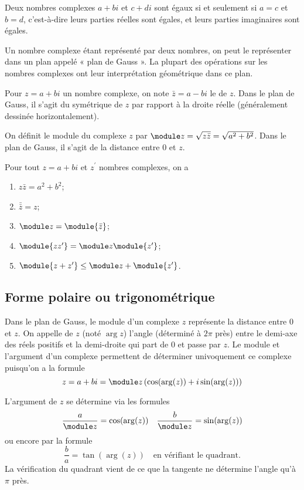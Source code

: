  Deux nombres complexes $a + bi$ et $c + di$ sont égaux si et seulement
 si $a = c$ et $b = d$, c'est-à-dire leurs parties réelles sont égales,
 et leurs parties imaginaires sont égales.

 Un nombre complexe étant représenté par deux nombres, on peut le
 représenter dans un plan appelé « plan de Gauss ». La plupart des
 opérations sur les nombres complexes ont leur interprétation
 géométrique dans ce plan.

 Pour $z = a + bi$ un nombre complexe, on note $\bar z = a - bi$ le
  de $z$. Dans le plan de Gauss, il s'agit du
 symétrique de $z$ par rapport à la droite réelle (généralement
 dessinée horizontalement).

 On définit le module du complexe $z$ par $\module z = \sqrt{z\bar z} =
 \sqrt{a^2 + b^2}$. Dans le plan de Gauss, il s'agit de la distance
 entre $0$ et $z$.

 \begin{proposition}
Pour tout $z = a+bi$ et $z^\prime$ nombres complexes, on a
   \begin{enumerate}
   \item $z \bar z = a^2 + b^2$;
   \item $\bar{\bar{z}} = z$;
   \item $\module z = \module {\bar z}$;
   \item $\module{zz^\prime} = \module z \module{z^\prime}$;
   \item $\module{z+z^\prime} \leq \module z + \module{z^\prime}$.
   \end{enumerate}
 \end{proposition}

 \subsection{Forme polaire ou trigonométrique}
 Dans le plan de Gauss, le module d'un complexe $z$ représente la
 distance entre $0$ et $z$. On appelle  de $z$ (noté
 $\arg z$) l'angle (déterminé à $2\pi$ près) entre le demi-axe des
 réels positifs et la demi-droite qui part de $0$ et passe par $z$. Le
 module et l'argument d'un complexe permettent de déterminer
 univoquement ce complexe puisqu'on a la formule
 \[z = a + bi = \module z \left( \cos(\arg(z)) + i \sin(\arg(z))
 \right)\]

 L'argument de $z$ se détermine via les formules
 \[\frac a {\module z} = \cos(\arg(z)) \quad \frac b {\module z} =
 \sin(\arg(z))\] ou encore par la formule
 \[\frac b a = \tan(\arg(z)) \quad \text{en vérifiant le
   quadrant.}\]%
 La vérification du quadrant vient de ce que la tangente ne détermine
 l'angle qu'à $\pi$ près.

